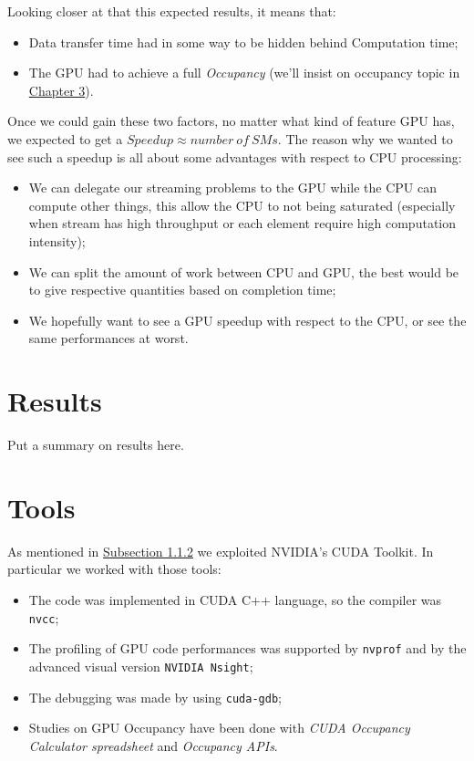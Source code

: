 		Looking closer at that this expected results, it means that:
		\begin{itemize}
			\item Data transfer time had in some way to be hidden behind Computation time; 
			
			\item The GPU had to achieve a full \textit{Occupancy} (we'll insist on occupancy topic in \hyperref[chap:logic]{Chapter 3}).\\
		\end{itemize}
		
		Once we could gain these two factors, no matter what kind of feature GPU has, we expected to get a \(Speedup \approx number \: of \: SMs \).
		The reason why we wanted to see such a speedup is all about some advantages with respect to CPU processing:
		\begin{itemize}
			\item We can delegate our streaming problems to the GPU while the CPU can compute other things, this allow the CPU to not being saturated (especially when stream has high throughput or each element require high computation intensity); 
			
			\item We can split the amount of work between CPU and GPU, the best would be to give respective quantities based on completion time;
			 
			
			\item We hopefully want to see a GPU speedup with respect to the CPU, or see the same performances at worst.\\
		\end{itemize}
		
		
		
	\section{Results}
	Put a summary on results here.\\
	\section{Tools}
	\label{sect:tools}
		As mentioned in \hyperref[subs:otherApps]{Subsection 1.1.2} we exploited NVIDIA's CUDA Toolkit.
		In particular we worked with those tools:
		\begin{itemize}
			\item The code was implemented in CUDA C++ language, so the compiler was \texttt{nvcc};
			
			\item The profiling of GPU code performances was supported by \texttt{nvprof} and by the advanced visual version \texttt{NVIDIA Nsight};
			
			\item The debugging was made by using \texttt{cuda-gdb};
			
			\item Studies on GPU Occupancy have been done with \textit{CUDA Occupancy Calculator spreadsheet} and \textit{Occupancy APIs}.\\
		\end{itemize}
		

